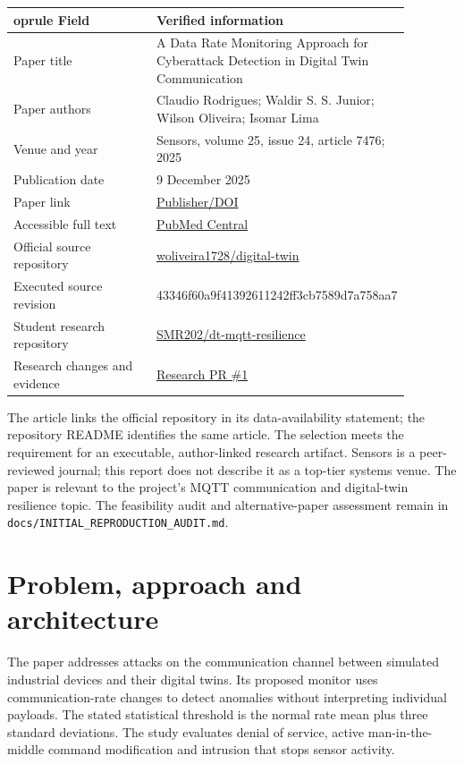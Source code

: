 \documentclass[11pt,a4paper]{article}
\begin{document}
\begingroup\small\setlength{\tabcolsep}{3pt}\begin{longtable}{p{0.44\linewidth}p{0.44\linewidth}}	oprule
Field & Verified information \\
\midrule\endhead
Paper title & A Data Rate Monitoring Approach for Cyberattack Detection in Digital Twin Communication \\
Paper authors & Claudio Rodrigues; Waldir S. S. Junior; Wilson Oliveira; Isomar Lima \\
Venue and year & Sensors, volume 25, issue 24, article 7476; 2025 \\
Publication date & 9 December 2025 \\
Paper link & \href{https://doi.org/10.3390/s25247476}{Publisher/DOI} \\
Accessible full text & \href{https://pmc.ncbi.nlm.nih.gov/articles/PMC12736672/}{PubMed Central} \\
Official source repository & \href{https://github.com/woliveira1728/digital-twin}{woliveira1728/digital-twin} \\
Executed source revision & 43346f60a9f41392611242ff3cb7589d7a758aa7 \\
Student research repository & \href{https://github.com/SMR202/dt-mqtt-resilience}{SMR202/dt-mqtt-resilience} \\
Research changes and evidence & \href{https://github.com/SMR202/dt-mqtt-resilience/pull/1}{Research PR \#1} \\
\bottomrule\end{longtable}\endgroup

The article links the official repository in its data-availability statement; the repository README identifies the same article. The selection meets the requirement for an executable, author-linked research artifact. Sensors is a peer-reviewed journal; this report does not describe it as a top-tier systems venue. The paper is relevant to the project's MQTT communication and digital-twin resilience topic. The feasibility audit and alternative-paper assessment remain in \texttt{docs/INITIAL\_REPRODUCTION\_AUDIT.md}.


\section{Problem, approach and architecture}

The paper addresses attacks on the communication channel between simulated industrial devices and their digital twins. Its proposed monitor uses communication-rate changes to detect anomalies without interpreting individual payloads. The stated statistical threshold is the normal rate mean plus three standard deviations. The study evaluates denial of service, active man-in-the-middle command modification and intrusion that stops sensor activity.
\end{document}
